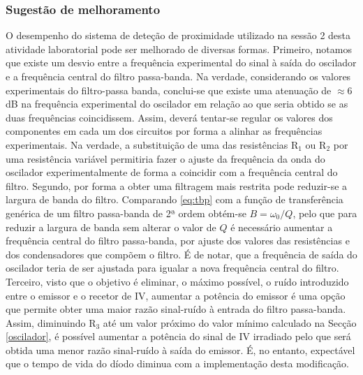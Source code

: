 \subsubsection{Sugestão de melhoramento}
O desempenho do sistema de deteção de proximidade utilizado na sessão 2 desta atividade laboratorial pode ser melhorado de diversas formas. Primeiro, notamos que existe um desvio entre a frequência experimental do sinal à saída do oscilador e a frequência central do filtro passa-banda. Na verdade, considerando os valores experimentais do filtro-passa banda, conclui-se que existe uma atenuação de $\approx 6$dB na frequência experimental do oscilador em relação ao que seria obtido se as duas frequências coincidissem. Assim, deverá tentar-se regular os valores dos componentes em cada um dos circuitos por forma a alinhar as frequências experimentais. Na verdade, a substituição de uma das resistências $\mathrm{R_1}$ ou $\mathrm{R_2}$ por uma resistência variável permitiria fazer o ajuste da frequência da onda do oscilador experimentalmente de forma a coincidir com a frequência central do filtro. Segundo, por forma a obter uma filtragem mais restrita pode reduzir-se a largura de banda do filtro. Comparando \eqref{eq:tbp} com a função de transferência genérica de um filtro passa-banda de 2ª ordem obtém-se $B = \omega_0/Q$, pelo que para reduzir a largura de banda sem alterar o valor de $Q$ é necessário aumentar a frequência central do filtro passa-banda, por ajuste dos valores das resistências e dos condensadores que compõem o filtro. É de notar, que a frequência de saída do oscilador teria de ser ajustada para igualar a nova frequência central do filtro. Terceiro, visto que o objetivo é eliminar, o máximo possível, o ruído introduzido entre o emissor e o recetor de IV, aumentar a potência do emissor é uma opção que permite obter uma maior razão sinal-ruído à entrada do filtro passa-banda. Assim, diminuindo $\mathrm{R_3}$ até um valor próximo do valor mínimo calculado na Secção \ref{oscilador}, é possível aumentar a potência do sinal de IV irradiado pelo que será obtida uma menor razão sinal-ruído à saída do emissor. É, no entanto, expectável que o tempo de vida do díodo diminua com a implementação desta modificação.

